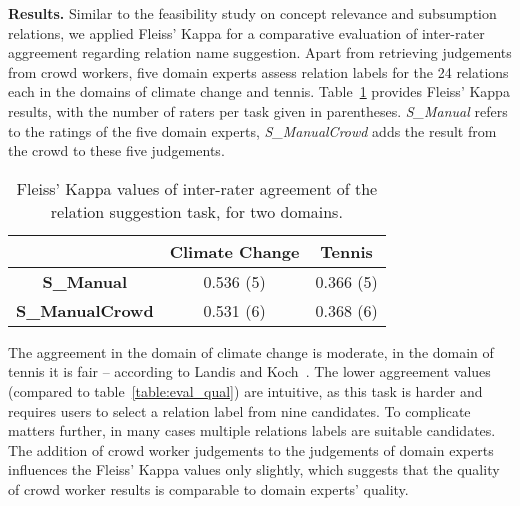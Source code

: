 
\textbf{Results.} 
Similar to the feasibility study on concept relevance and subsumption relations, 
we applied Fleiss' Kappa for a comparative evaluation of inter-rater aggreement 
regarding relation name suggestion. Apart from retrieving judgements from crowd workers, 
five domain experts assess relation labels for the 24 relations
each in the domains of climate change and tennis. Table~\ref{table:eval_rel_sugg} 
provides Fleiss' Kappa results, with the number of raters per task given in parentheses.  
\emph{S\_Manual} refers to the ratings of the five domain experts, \emph{S\_ManualCrowd} 
adds the result from the crowd to these five judgements.

\begin{table}
\center
\begin{tabular}{|c|c|c|} \hline
                                       & \textbf{Climate Change} & \textbf{Tennis}  \\ \hline
  \textbf{S\_Manual}                   & 0.536 (5)               & 0.366 (5)        \\ \hline
  \textbf{S\_ManualCrowd}              & 0.531 (6)               & 0.368 (6)        \\ \hline
\end{tabular}
\caption{Fleiss' Kappa values of inter-rater agreement of the relation suggestion task, for two domains.}
\label{table:eval_rel_sugg}
\end{table}

The aggreement in the domain of climate change is moderate, in the domain of tennis it is fair -- 
according to Landis and Koch~\cite{landis1977}. 
The lower aggreement values (compared to table~\ref{table:eval_qual}) are intuitive, as this task 
is harder and requires users to select a relation label from nine candidates. 
To complicate matters further, in many cases multiple relations labels are suitable candidates.
The addition of crowd worker judgements to the judgements of domain experts influences the Fleiss' 
Kappa values only slightly, which suggests that the quality of crowd worker results is comparable 
to domain experts' quality.


